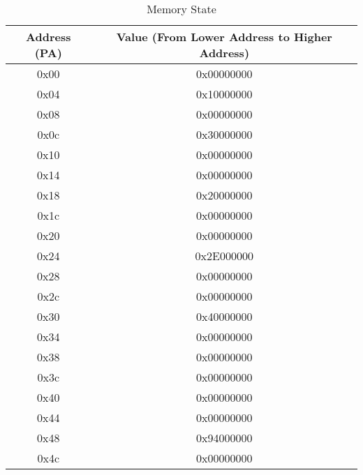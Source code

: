 \documentclass[addpoints, 12pt, answers]{exam}
\begin{document}
\begin{questions}
\begin{parts}
		\begin{table}[H]
			\centering
			\caption{Memory State}\label{tab:b:ini-mem}
			\begin{tabular}{|c|c|}
				\hline
				Address (PA) & \quad Value (From Lower Address to Higher Address)  \quad\quad \\ \hline
				0x00         & 0x00000000                                                     \\ \hline
				0x04         & 0x10000000                                                     \\ \hline
				0x08         & 0x00000000                                                     \\ \hline
				0x0c         & 0x30000000                                                     \\ \hline
				0x10         & 0x00000000                                                     \\ \hline
				0x14         & 0x00000000                                                     \\ \hline
				0x18         & 0x20000000                                                     \\ \hline
				0x1c         & 0x00000000                                                     \\ \hline
				0x20         & 0x00000000                                                     \\ \hline
				0x24         & 0x2E000000                                                     \\ \hline
				0x28         & 0x00000000                                                     \\ \hline
				0x2c         & 0x00000000                                                     \\ \hline
				0x30         & 0x40000000                                                     \\ \hline
				0x34         & 0x00000000                                                     \\ \hline
				0x38         & 0x00000000                                                     \\ \hline
				0x3c         & 0x00000000                                                     \\ \hline
				0x40         & 0x00000000                                                     \\ \hline
				0x44         & 0x00000000                                                     \\ \hline
				0x48         & 0x94000000                                                     \\ \hline
				0x4c         & 0x00000000                                                     \\ \hline
			\end{tabular}
		\end{table}


\end{parts}
\end{questions}
\end{document}
